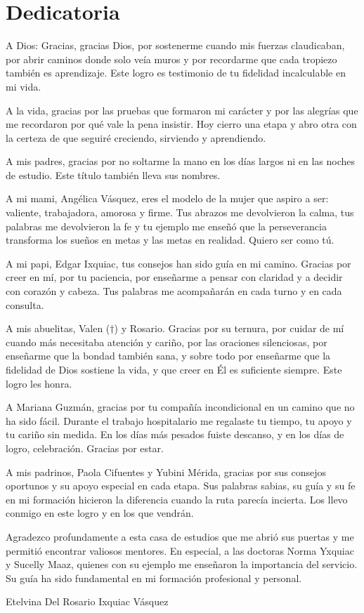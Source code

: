\chapter*{Dedicatoria}
A Dios: Gracias, gracias Dios, por sostenerme cuando mis fuerzas claudicaban, 
por abrir caminos donde solo veía muros y por recordarme que cada tropiezo 
también es aprendizaje. Este logro es testimonio de tu fidelidad incalculable 
en mi vida.

A la vida, gracias por las pruebas que formaron mi carácter y por las alegrías 
que me recordaron por qué vale la pena insistir. Hoy cierro una etapa y abro 
otra con la certeza de que seguiré creciendo, sirviendo y aprendiendo.

A mis padres, gracias por no soltarme la mano en los días largos ni en las 
noches de estudio. Este título también lleva sus nombres.

A mi mami, Angélica Vásquez, eres el modelo de la mujer que aspiro a ser: 
valiente, trabajadora, amorosa y firme. Tus abrazos me devolvieron la calma, 
tus palabras me devolvieron la fe y tu ejemplo me enseñó que la perseverancia 
transforma los sueños en metas y las metas en realidad. Quiero ser como tú.

A mi papi, Edgar Ixquiac, tus consejos han sido guía en mi camino. Gracias por 
creer en mí, por tu paciencia, por enseñarme a pensar con claridad y a decidir 
con corazón y cabeza. Tus palabras me acompañarán en cada turno y en cada 
consulta.

A mis abuelitas, Valen ($\dagger$) y Rosario. Gracias por su ternura, por cuidar
de mí cuando más necesitaba atención y cariño, por las oraciones silenciosas,
por enseñarme que  la bondad también sana, y sobre todo por enseñarme que la
fidelidad de Dios sostiene la vida, y que creer en Él es suficiente siempre.
Este logro les honra.

A Mariana Guzmán, gracias por tu compañía incondicional en un camino que no ha 
sido fácil. Durante el trabajo hospitalario me regalaste tu tiempo, tu apoyo y 
tu cariño sin medida. En los días más pesados fuiste descanso, y en los días 
de logro, celebración. Gracias por estar.

A mis padrinos, Paola Cifuentes y Yubini Mérida, gracias por sus consejos 
oportunos y su apoyo especial en cada etapa. Sus palabras sabias, su guía y su 
fe en mi formación hicieron la diferencia cuando la ruta parecía incierta. Los 
llevo conmigo en este logro y en los que vendrán.

Agradezco profundamente a esta casa de estudios que me abrió sus puertas y me 
permitió encontrar valiosos mentores. En especial, a las doctoras Norma Yxquiac 
y Sucelly Maaz, quienes con su ejemplo me enseñaron la importancia del servicio. 
Su guía ha sido fundamental en mi formación profesional y personal.

\begin{flushright}
Etelvina Del Rosario Ixquiac Vásquez
\end{flushright}
